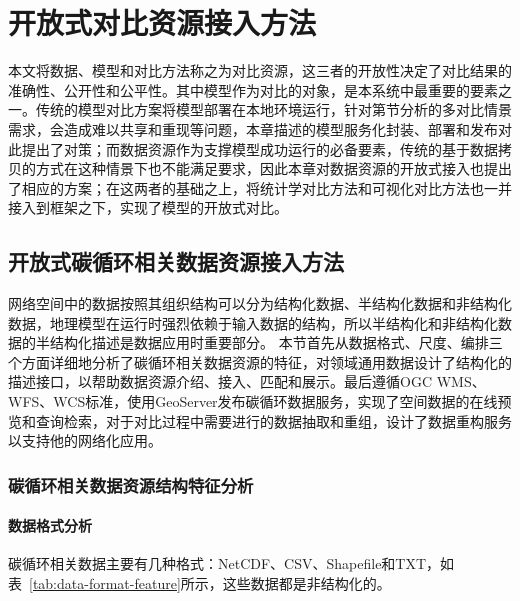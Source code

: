 \chapter{开放式对比资源接入方法}
本文将数据、模型和对比方法称之为对比资源，这三者的开放性决定了对比结果的准确性、公开性和公平性。其中模型作为对比的对象，是本系统中最重要的要素之一。传统的模型对比方案将模型部署在本地环境运行，针对第\label{sec:scene}节分析的多对比情景需求，会造成难以共享和重现等问题，本章描述的模型服务化封装、部署和发布对此提出了对策；而数据资源作为支撑模型成功运行的必备要素，传统的基于数据拷贝的方式在这种情景下也不能满足要求，因此本章对数据资源的开放式接入也提出了相应的方案；在这两者的基础之上，将统计学对比方法和可视化对比方法也一并接入到框架之下，实现了模型的开放式对比。

\section{开放式碳循环相关数据资源接入方法}
\label{sec:data-joinup}
网络空间中的数据按照其组织结构可以分为结构化数据、半结构化数据和非结构化数据，地理模型在运行时强烈依赖于输入数据的结构，所以半结构化和非结构化数据的半结构化描述是数据应用时重要部分。
本节首先从数据格式、尺度、编排三个方面详细地分析了碳循环相关数据资源的特征，对领域通用数据设计了结构化的描述接口，以帮助数据资源介绍、接入、匹配和展示。最后遵循OGC WMS、WFS、WCS标准，使用GeoServer发布碳循环数据服务，实现了空间数据的在线预览和查询检索，对于对比过程中需要进行的数据抽取和重组，设计了数据重构服务以支持他的网络化应用。

\subsection{碳循环相关数据资源结构特征分析}
\subsubsection{数据格式分析}
碳循环相关数据主要有几种格式：NetCDF、CSV、Shapefile和TXT，如表~\ref{tab:data-format-feature}所示，这些数据都是非结构化的。

